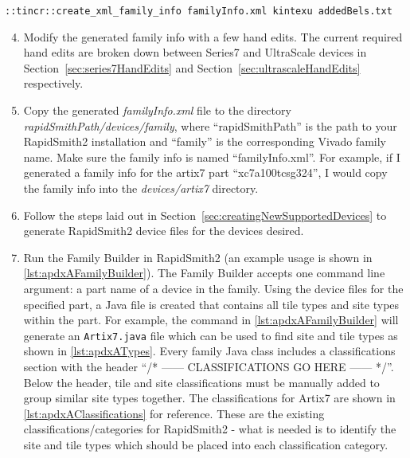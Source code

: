 \begin{lstlisting}[numbers=none, caption=Family info example usage, label=lst:apdxAFamilyInfo] 
::tincr::create_xml_family_info familyInfo.xml kintexu addedBels.txt 
\end{lstlisting}


\begin{enumerate}
\setcounter{enumi}{3}    
    \item Modify the generated family info with a few hand edits. The
    current required hand edits are broken down between Series7 and UltraScale
    devices in
    Section~\ref{sec:series7HandEdits} and Section~\ref{sec:ultrascaleHandEdits}
    respectively.

	\item Copy the generated \textit{familyInfo.xml} file to the directory
	\textit{rapidSmithPath/devices/family}, where ``rapidSmithPath'' is the path to
	your RapidSmith2 installation and ``family'' is the corresponding Vivado family
	name. Make sure the family info is named ``familyInfo.xml''. For example, if I
	generated a family info for the artix7 part ``xc7a100tcsg324'', I would copy
	the family info into the \textit{devices/artix7} directory.

	\item Follow the steps laid out in Section~\ref{sec:creatingNewSupportedDevices} to
	generate RapidSmith2 device files for the devices desired.
	    
	\item Run the Family Builder in RapidSmith2 (an example usage is shown in
	\autoref{lst:apdxAFamilyBuilder}). The Family Builder accepts one command line
	argument: a part name of a device in the family. Using the device files for
	the specified part, a Java file is created that contains all tile types and
	site types within the part. For example, the command in
	\autoref{lst:apdxAFamilyBuilder} will generate an \texttt{Artix7.java} file
	which can be used to find site and tile types as shown in
	\autoref{lst:apdxATypes}. Every family Java class includes a classifications
	section with the header ``/* ------ CLASSIFICATIONS GO HERE ------ */''. Below
	the header, tile and site classifications must be manually added to group
	similar site types together. The classifications for Artix7 are shown in
	\autoref{lst:apdxAClassifications} for reference.  These are the existing
	classifications/categories for RapidSmith2 - what is needed is to identify the
	site and tile types which should be placed into each classification category.
	
\end{enumerate}


